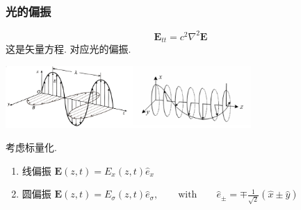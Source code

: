 \begin{frame}
 \frametitle{光的偏振}
 \[\mathbf{E}_{tt} =c^2\nabla^2 \mathbf{E}\]
 这是矢量方程. 对应光的偏振. 
   \begin{center}
        \includegraphics[width=0.7\textwidth]{figs/10.png}
   \end{center}
   \pause
 考虑标量化.
 \begin{enumerate}
     \item 线偏振 $\mathbf{E}(z,t) = E_x(z,t) \hat{e}_x $ 
     \item 圆偏振 $\mathbf{E}(z,t) = E_\sigma(z,t) \hat{e}_{\sigma}, \qquad \text{with} \qquad \hat{e}_{\pm}= \mp \frac{1}{\sqrt{2}} (\hat{x} \pm \hat{y}) $
 \end{enumerate}
\end{frame}

\begin{frame}
      \frametitle{}
      ~~\\
\end{frame}

